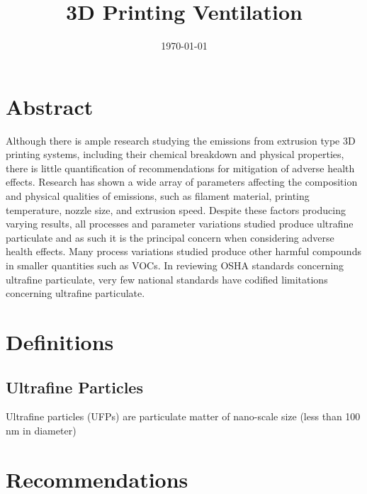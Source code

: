 \documentclass[11pt]{article}
\date{\today}
\title{3D Printing Ventilation}
\begin{document}
\pretitle{\begin{flushleft}\fontsize{18bp}{18bp}\selectfont}
  \posttitle{\par\end{flushleft}}
\predate{\begin{flushleft}}
\postdate{\end{flushleft}}

\maketitle

\section{Abstract}
\label{sec:orgc06e10e}
Although there is ample research studying the emissions from extrusion type 3D printing systems, including their chemical breakdown and physical properties, there is little quantification of recommendations for mitigation of adverse health effects. Research has shown a wide array of parameters affecting the composition and physical qualities of emissions, such as filament material, printing temperature, nozzle size, and extrusion speed. Despite these factors producing varying results, all processes and parameter variations studied produce ultrafine particulate and as such it is the principal concern when considering adverse health effects. Many process variations studied produce other harmful compounds in smaller quantities such as VOCs. In reviewing OSHA standards concerning ultrafine particulate, very few national standards have codified limitations concerning ultrafine particulate.

\section{Definitions}
\label{sec:org83fc37e}

\subsection{Ultrafine Particles}
\label{sec:org5593488}
Ultrafine particles (UFPs) are particulate matter of nano-scale size (less than 100 nm in diameter)

\section{Recommendations}
\label{sec:org8bca10a}
\end{document}
